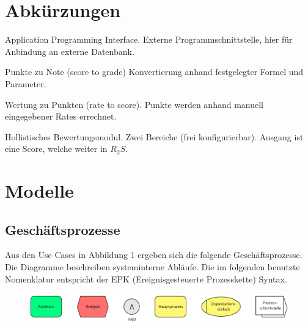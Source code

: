 \begin{appendix}
\begin{description}
	 
	\end{description}
  \section{Abkürzungen}
  
  	\begin{description}
  	\item[API] Application Programming Interface. Externe Programmschnittstelle, hier für Anbindung an externe Datenbank.
  	\item[$S_2G$] Punkte zu Note (score to grade) Konvertierung  anhand festgelegter Formel und Parameter.
  	\item[$R_2S$] Wertung zu Punkten (rate to score). Punkte werden anhand manuell eingegebener Rates errechnet. 
  	\item[$H_2$] Hollistisches Bewertungsmodul. Zwei Bereiche (frei konfigurierbar). Ausgang ist eine Score, welche weiter in $R_2S$.
  	
  	
  	\end{description}
  \section{Modelle}
  \subsection{Geschäftsprozesse}
  

  	Aus den Use Cases in Abbildung 1 ergeben sich die folgende Geschäftsprozesse.\\
  	Die Diagramme beschreiben systeminterne Abläufe. Die im folgenden benutzte Nomenklatur entspricht der EPK (Ereignisgesteuerte Prozesskette) Syntax.
  	
  	\begin{figure}[th!]
  	\centering
  	\includegraphics[width=\textwidth]{./img/EPK_legend}
  	\label{fig:legend}
  	\end{figure}
  	  	

\end{appendix}
